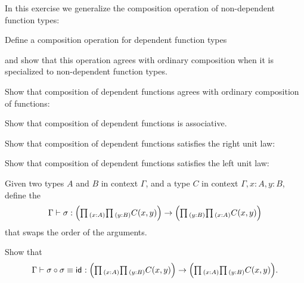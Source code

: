 \begin{exercises}
\item In this exercise we generalize the composition operation of non-dependent function types:
\begin{subexenum}
\item Define a composition operation for dependent function types
\begin{prooftree}
\end{prooftree}
and show that this operation agrees with ordinary composition when it is specialized to non-dependent function types.
\item Show that composition of dependent functions agrees with ordinary composition of functions:
  \begin{prooftree}
  \end{prooftree}
\item Show that composition of dependent functions is associative.
\item Show that composition of dependent functions satisfies the right unit law:
\begin{prooftree}
\end{prooftree}
\item Show that composition of dependent functions satisfies the left unit law:
\begin{prooftree}
\end{prooftree}
\end{subexenum}
\item \label{ex:swap}
\begin{subexenum}
\item Given two types $A$ and $B$ in context $\Gamma$, and a type $C$ in context $\Gamma,x:A,y:B$, define the 
\begin{equation*}
\Gamma\vdash \sigma:\Big(\prd{x:A}{y:B}C(x,y)\Big)\to\Big(\prd{y:B}{x:A}C(x,y)\Big)
\end{equation*}
that swaps the order of the arguments.
\item Show that
\begin{equation*}
\Gamma\vdash \sigma\circ\sigma\jdeq\idfunc:\Big(\prd{x:A}{y:B}C(x,y)\Big)\to \Big(\prd{x:A}{y:B}C(x,y)\Big).
\end{equation*}
\end{subexenum}
\end{exercises}
